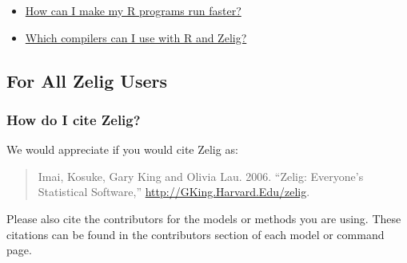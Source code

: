 \documentclass[letterpaper,10pt,english]{sphinxmanual}
\begin{document}
{\begin{minipage}{0.95\linewidth}
\begin{itemize}
\begin{itemize}
\item {} 
{\hyperref[docs/faq:how-can-i-make-my-r-programs-run-faster]{How can I make my R programs run faster?}}

\item {} 
{\hyperref[docs/faq:which-compilers-can-i-use-with-r-and-zelig]{Which compilers can I use with R and Zelig?}}

\end{itemize}

\end{itemize}
\end{minipage}}
\begin{center}\setlength{\fboxsep}{5pt}\end{center}


\subsection{For All Zelig Users}
\label{docs/faq:for-all-zelig-users}

\subsubsection{How do I cite Zelig?}
\label{docs/faq:how-do-i-cite-zelig}
We would appreciate if you would cite Zelig as:
\begin{quote}

Imai, Kosuke, Gary King and Olivia Lau. 2006. “Zelig: Everyone’s
Statistical Software,” \href{http://GKing.Harvard.Edu/zelig}{http://GKing.Harvard.Edu/zelig}.
\end{quote}

Please also cite the contributors for the models or methods you are
using. These citations can be found in the contributors section of each
model or command page.
\end{document}
